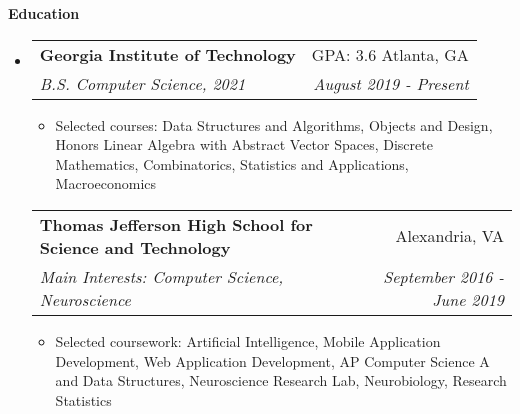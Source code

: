 \documentclass[letterpaper,10pt]{article}
\makeatletter
\newcommand{\resitem}[1]{\item #1 \vspace{-2pt}}
\newcommand{\resheading}[1]{{\large \colorbox{mygrey}{\begin{minipage}{\textwidth}{\textbf{#1 \vphantom{p\^{E}}}}\end{minipage}}}}
\newcommand{\ressubheading}[4]{
\begin{tabular*}{7.0in}{l@{\extracolsep{\fill}}r}
		\textbf{#1} & #2 \\
		\textit{#3} & \textit{#4} \\
\end{tabular*}\vspace{-6pt}}
\makeatother
\begin{document}
\resheading{Education}
\begin{itemize}
\item[]  %
    \ressubheading{Georgia Institute of Technology}{GPA: 3.6 \hspace{1em} Atlanta, GA}{B.S. Computer Science, 2021}{August 2019 - Present}
	\begin{itemize}
	    \resitem{Selected courses: Data Structures and Algorithms, Objects and Design, Honors Linear Algebra with Abstract Vector Spaces, Discrete Mathematics, Combinatorics, Statistics and Applications, Macroeconomics}
	\end{itemize}
	\ressubheading{Thomas Jefferson High School for Science and Technology}{Alexandria, VA}{Main Interests: Computer Science, Neuroscience}{September 2016 - June 2019}
	\begin{itemize}
        \resitem{Selected coursework: Artificial Intelligence, Mobile Application Development, Web Application Development, AP Computer Science A and Data Structures, Neuroscience Research Lab, Neurobiology, Research Statistics}
	\end{itemize}
\end{itemize}


\end{document}
